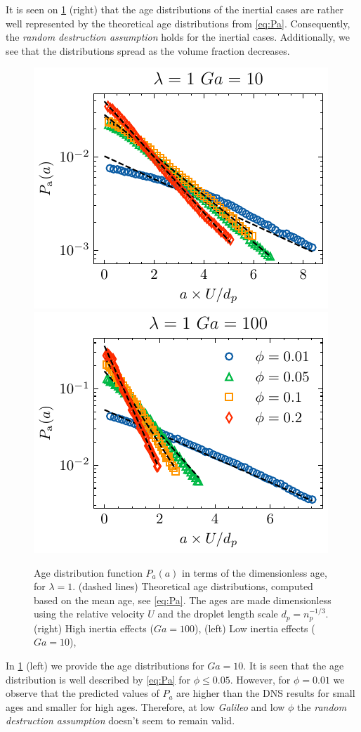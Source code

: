 It is seen on \ref{fig:age_picture} (right) that the age distributions of the inertial cases are rather well represented by the theoretical age distributions from \ref{eq:Pa}.
Consequently, the \textit{random destruction assumption} holds for the inertial cases. 
Additionally, we see that the distributions spread as the volume fraction decreases.
\begin{figure}[h!]
    \centering
    \includegraphics[height = 0.3\textwidth]{image/HOMOGENEOUS_NEW/Dist/Pa_l_1_Ga_10.pdf}
    \includegraphics[height = 0.3\textwidth]{image/HOMOGENEOUS_NEW/Dist/Pa_l_1_Ga_100.pdf}
    \caption{
    Age distribution function $P_a(a)$ in terms of the dimensionless age, for $\lambda = 1$.
    (dashed lines) Theoretical age distributions, computed based on the mean age, see \ref{eq:Pa}. 
    The ages are made dimensionless using the relative velocity $U$ and the droplet length scale $d_p = n_p^{-1/3}$.  
    (right) High inertia effects ($Ga = 100$),
    (left) Low inertia effects ($Ga = 10$),
    }
    \label{fig:age_picture}
\end{figure}
In \ref{fig:age_picture} (left)  we provide the age distributions for $Ga = 10$. 
It is seen that the age distribution is well described by \ref{eq:Pa} for $\phi \le 0.05$.
However, for $\phi = 0.01$ we observe that the predicted values of $P_a$ are higher than the DNS results for small ages and smaller for high ages. 
Therefore, at low \textit{Galileo} and low $\phi$ the \textit{random destruction assumption} doesn't seem to remain valid. 
